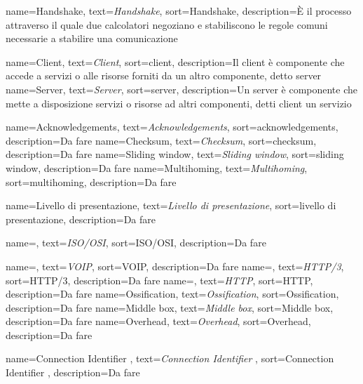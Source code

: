  {
    name=Handshake,
    text=\emph{Handshake},
    sort=Handshake,
    description={È il processo attraverso il quale due calcolatori negoziano e stabiliscono le regole comuni necessarie a stabilire una comunicazione}
}

 {
    name=Client,
    text=\emph{Client},
    sort=client,
    description={Il client è componente che accede a servizi o alle risorse forniti da un altro componente, detto \gls{server} }
}
 {
    name=Server,
    text=\emph{Server},
    sort=server,
    description={Un server è componente che mette a disposizione servizi o risorse ad altri componenti, detti \gls{client} un servizio}
}

 {
    name=Acknowledgements,
    text=\emph{Acknowledgements},
    sort=acknowledgements,
    description={Da fare}
}
 {
    name=Checksum,
    text=\emph{Checksum},
    sort=checksum,
    description={Da fare}
}
 {
    name=Sliding window,
    text=\emph{Sliding window},
    sort=sliding window,
    description={Da fare}
}
 {
    name=Multihoming,
    text=\emph{Multihoming},
    sort=multihoming,
    description={Da fare}
}

 {
    name=Livello di presentazione,
    text=\emph{Livello di presentazione},
    sort=livello di presentazione,
    description={Da fare}
}

 {
    name=,
    text=\emph{ISO/OSI},
    sort=ISO/OSI,
    description={Da fare}
}

 {
    name=,
    text=\emph{VOIP},
    sort=VOIP,
    description={Da fare}
}
 {
    name=,
    text=\emph{HTTP/3},
    sort=HTTP/3,
    description={Da fare}
}
 {
    name=,
    text=\emph{HTTP},
    sort=HTTP,
    description={Da fare}
}
 {
    name=Ossification,
    text=\emph{Ossification},
    sort=Ossification,
    description={Da fare}
}
 {
    name=Middle box,
    text=\emph{Middle box},
    sort=Middle box,
    description={Da fare}
}
 {
    name=Overhead,
    text=\emph{Overhead},
    sort=Overhead,
    description={Da fare}
}

 {
    name=Connection Identifier ,
    text=\emph{Connection Identifier },
    sort=Connection Identifier ,
    description={Da fare}
}

